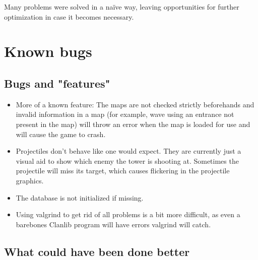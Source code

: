 \documentclass[11pt]{article}
\begin{document}
Many problems were solved in a naïve way, leaving opportunities for
further optimization in case it becomes necessary.
\section{Known bugs}
\label{sec-4}
\subsection*{Bugs and "features"}
\label{sec-4_1}

\begin{itemize}
\item More of a known feature: The maps are not checked strictly
  beforehands and invalid information in a map (for example, wave
  using an entrance not present in the map) will throw an error when
  the map is loaded for use and will cause the game to crash.
\item Projectiles don't behave like one would expect. They are
  currently just a visual aid to show which enemy the tower is
  shooting at. Sometimes the projectile will miss its target, which
  causes flickering in the projectile graphics.
\item The database is not initialized if missing.
\item Using valgrind to get rid of all problems is a bit more
  difficult, as even a barebones Clanlib program will have errors
  valgrind will catch.

\end{itemize}
\subsection*{What could have been done better}
\label{sec-4_2}
\end{document}
